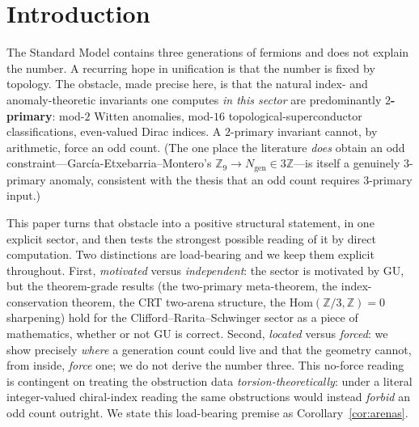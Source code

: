 \documentclass[11pt]{article}
\theoremstyle{definition}
\theoremstyle{remark}
\newcommand{\Z}{\mathbb{Z}}
\newcommand{\Hom}{\mathrm{Hom}}
\begin{document}
\begin{abstract}
We do \emph{not} claim three generations. The ``located, not forced'' reading is contingent on treating the
obstruction data torsion-theoretically; under a literal integer-valued chiral-index reading the same
obstructions would instead \emph{forbid} an odd count outright. We claim a no-go that \emph{locates}, and that
relocates the count to external background data; the identification $\text{order-}3\text{ class}\to\text{integer
}3$ is posed as the single named open conjecture (a candidate category error, made algebraically explicit by
$\Hom(\Z/3,\Z)=0$). External review of both the core results and the open bridge is requested.
\end{abstract}

\section{Introduction}\label{sec:intro}

The Standard Model contains three generations of fermions and does not explain the number. A recurring hope in
unification is that the number is fixed by topology. The obstacle, made precise here, is that the natural index-
and anomaly-theoretic invariants one computes \emph{in this sector} are predominantly \textbf{$2$-primary}:
mod-$2$ Witten anomalies, mod-$16$ topological-superconductor classifications, even-valued Dirac indices. A
$2$-primary invariant cannot, by arithmetic, force an odd count. (The one place the literature \emph{does} obtain
an odd constraint---Garc\'ia-Etxebarria--Montero's $\Z_9 \to N_{\mathrm{gen}}\in 3\Z$---is itself a genuinely
$3$-primary anomaly, consistent with the thesis that an odd count requires $3$-primary input.)

This paper turns that obstacle into a positive structural statement, in one explicit sector, and then tests the
strongest possible reading of it by direct computation. Two distinctions are load-bearing and we keep them
explicit throughout. First, \emph{motivated} versus \emph{independent}: the sector is motivated by GU, but the
theorem-grade results (the two-primary meta-theorem, the index-conservation theorem, the CRT two-arena structure,
the $\Hom(\Z/3,\Z)=0$ sharpening) hold for the Clifford--Rarita--Schwinger sector as a piece of mathematics,
whether or not GU is correct. Second, \emph{located} versus \emph{forced}: we show precisely \emph{where} a
generation count could live and that the geometry cannot, from inside, \emph{force} one; we do not derive the
number three. This no-force reading is contingent on treating the obstruction data \emph{torsion-theoretically}:
under a literal integer-valued chiral-index reading the same obstructions would instead \emph{forbid} an odd
count outright. We state this load-bearing premise as Corollary~\ref{cor:arenas}.
\end{document}
